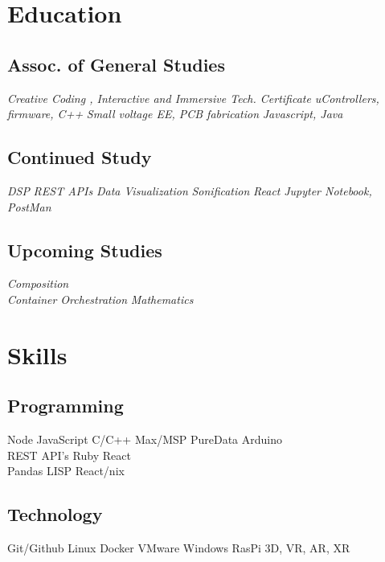 \documentclass[]{quinnJarvisHollandLatex}
\begin{document}
\hfill
\begin{minipage}[t]{0.33\textwidth}


\section{Education} 
\subsection{Assoc. of General Studies}
\textit{Creative Coding , Interactive and Immersive Tech. Certificate} 
\textit{uControllers, firmware, C++} 
\textit{Small voltage EE, PCB fabrication} 
\textit{Javascript, Java} 
\sectionsep
\subsection{Continued Study}
\textit{DSP} 
\textit{REST APIs} 
\textit{Data Visualization}
\textit{Sonification} 
\textit{React}
\textit{Jupyter Notebook, PostMan } 
\sectionsep
\subsection{Upcoming Studies} 
\textit{Composition } \\
\textit{Container Orchestration } 
\textit{Mathematics } 
\sectionsep


\section{Skills}

\subsection{Programming}
Node \textbullet{}JavaScript \textbullet{} C/C++ \textbullet{}Max/MSP \textbullet{}PureData \textbullet{}Arduino\\
REST API's \textbullet{} Ruby \textbullet{} React \\
Pandas \textbullet{} LISP \textbullet{} React/nix \\
\subsection{Technology}
Git/Github \textbullet{} Linux \textbullet{}Docker \textbullet{}VMware \textbullet{} Windows \textbullet{}RasPi \textbullet{}3D, VR, AR, XR\\

\end{minipage}
\end{document}
